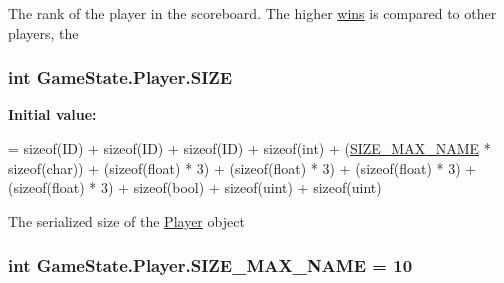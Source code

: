 The rank of the player in the scoreboard. The higher \hyperlink{class_game_state_1_1_player_a3a4d13459cad9bd58e058ddc6387af70}{wins} is compared to other players, the 

\hypertarget{class_game_state_1_1_player_ada2d068d3d5f973f73abac805c162d17}{
\subsubsection[{S\-I\-Z\-E}]{\setlength{\rightskip}{0pt plus 5cm}int Game\-State.\-Player.\-S\-I\-Z\-E\hspace{0.3cm}{\ttfamily [static]}}}\label{class_game_state_1_1_player_ada2d068d3d5f973f73abac805c162d17}
{\bfseries Initial value\-:}
\begin{DoxyCode}
=
            \textcolor{keyword}{sizeof}(ID) 
            + \textcolor{keyword}{sizeof}(ID) 
            + \textcolor{keyword}{sizeof}(ID) 
            + \textcolor{keyword}{sizeof}(\textcolor{keywordtype}{int}) + (\hyperlink{class_game_state_1_1_player_a1cdc9de8183b220e87632f7f6a7147d0}{SIZE\_MAX\_NAME} * \textcolor{keyword}{sizeof}(char))
            + (\textcolor{keyword}{sizeof}(float) * 3) 
            + (\textcolor{keyword}{sizeof}(float) * 3) 
            + (\textcolor{keyword}{sizeof}(float) * 3) 
            + (\textcolor{keyword}{sizeof}(float) * 3) 
            + \textcolor{keyword}{sizeof}(bool) 
            + \textcolor{keyword}{sizeof}(uint) 
            + \textcolor{keyword}{sizeof}(uint)
\end{DoxyCode}


The serialized size of the \hyperlink{class_game_state_1_1_player}{Player} object 

\hypertarget{class_game_state_1_1_player_a1cdc9de8183b220e87632f7f6a7147d0}{
\subsubsection[{S\-I\-Z\-E\-\_\-\-M\-A\-X\-\_\-\-N\-A\-M\-E}]{\setlength{\rightskip}{0pt plus 5cm}int Game\-State.\-Player.\-S\-I\-Z\-E\-\_\-\-M\-A\-X\-\_\-\-N\-A\-M\-E = 10\hspace{0.3cm}{\ttfamily [static]}}}\label{class_game_state_1_1_player_a1cdc9de8183b220e87632f7f6a7147d0}


